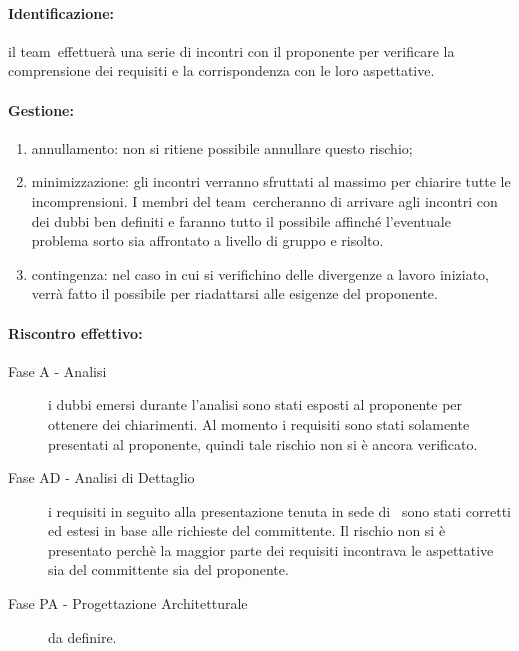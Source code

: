 \documentclass[../PianoProgetto.tex]{subfiles}
\begin{document}
	\paragraph*{Identificazione:} il team\g\ effettuerà una serie di incontri con il proponente per verificare la comprensione dei requisiti e la corrispondenza con le loro aspettative.
	
	\paragraph*{Gestione:}
	\begin{enumerate}
		\item annullamento: non si ritiene possibile annullare questo rischio;
		\item minimizzazione: gli incontri verranno sfruttati al massimo per chiarire tutte le incomprensioni. I membri del team\g\ cercheranno di arrivare agli incontri con dei dubbi ben definiti e faranno tutto il possibile affinché l'eventuale problema sorto sia affrontato a livello di gruppo e risolto.
		\item contingenza: nel caso in cui si verifichino delle divergenze a lavoro iniziato, verrà fatto il possibile per riadattarsi alle esigenze del proponente.
	\end{enumerate}	
	
	\paragraph*{Riscontro effettivo:}
		\begin{description}
			\item[Fase A - Analisi] i dubbi emersi durante l'analisi sono stati esposti al proponente per ottenere dei chiarimenti. Al momento i requisiti sono stati solamente presentati al proponente, quindi tale rischio non si è ancora verificato.
			\item[Fase AD - Analisi di Dettaglio]  i requisiti in seguito alla presentazione tenuta in sede di \revisionedeirequisiti\ sono stati corretti ed estesi in base alle richieste del committente. Il rischio non si è presentato perchè la maggior parte dei requisiti incontrava le aspettative sia del committente sia del proponente. 
			\item[Fase PA - Progettazione Architetturale] da definire.
		\end{description}

			
\end{document}
